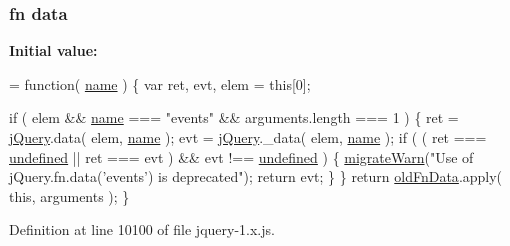 \subsubsection[{\texorpdfstring{data}{data}}]{ {\bf fn} data}\hypertarget{jquery-1_8x_8js_ad800f38c547e3a3ed2b14d23d10fc2b1}{}\label{jquery-1_8x_8js_ad800f38c547e3a3ed2b14d23d10fc2b1}
{\bfseries Initial value\+:}
\begin{DoxyCode}
= \textcolor{keyword}{function}( \hyperlink{common_8js_a22c29d2aa8ed6161ce8faa718ef76e68}{name} ) \{
    var ret, evt,
        elem = \textcolor{keyword}{this}[0];

    
    \textcolor{keywordflow}{if} ( elem && \hyperlink{common_8js_a22c29d2aa8ed6161ce8faa718ef76e68}{name} === \textcolor{stringliteral}{"events"} && arguments.length === 1 ) \{
        ret = \hyperlink{jquery-1_8x_8js_a2b1d6f9c448e3ce72f4e1865d6e38d2c}{jQuery}.data( elem, \hyperlink{common_8js_a22c29d2aa8ed6161ce8faa718ef76e68}{name} );
        evt = \hyperlink{jquery-1_8x_8js_a2b1d6f9c448e3ce72f4e1865d6e38d2c}{jQuery}.\_data( elem, \hyperlink{common_8js_a22c29d2aa8ed6161ce8faa718ef76e68}{name} );
        \textcolor{keywordflow}{if} ( ( ret === \hyperlink{jquery-1_8x_8js_a08113a236cc18d2a9d5ce27e638012be}{undefined} || ret === evt ) && evt !== \hyperlink{jquery-1_8x_8js_a08113a236cc18d2a9d5ce27e638012be}{undefined} ) \{
            \hyperlink{jquery-1_8x_8js_ac6036b3100bb484f96bfb15165e077f9}{migrateWarn}(\textcolor{stringliteral}{"Use of jQuery.fn.data('events') is deprecated"});
            \textcolor{keywordflow}{return} evt;
        \}
    \}
    \textcolor{keywordflow}{return} \hyperlink{jquery-1_8x_8js_abedd13ca7b5e331c7c0781cd2be12bda}{oldFnData}.apply( \textcolor{keyword}{this}, arguments );
\}
\end{DoxyCode}


Definition at line 10100 of file jquery-\/1.\+x.\+js.

